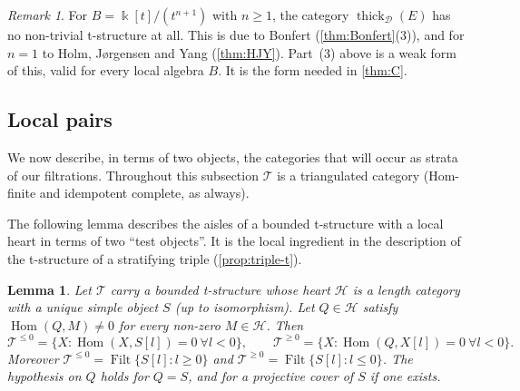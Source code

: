 \documentclass[11pt,reqno]{amsart}
\theoremstyle{plain}
\newtheorem{lemma}[theorem]{Lemma}
\theoremstyle{definition}
\theoremstyle{remark}
\newtheorem{remark}[theorem]{Remark}
\newcommand{\kk}{\Bbbk}
\DeclareMathOperator{\Hom}{Hom}
\DeclareMathOperator{\Filt}{Filt}
\newcommand{\thick}[2][\cD]{\operatorname{thick}_{#1}(#2)}
\newcommand{\cD}{\mathcal{D}}
\newcommand{\cH}{\mathcal{H}}
\newcommand{\cT}{\mathcal{T}}
\begin{document}
\begin{remark}\label{rem:local-exc-no-t}
For $B=\kk[t]/(t^{n+1})$ with $n\ge1$, the category $\thick E$ has no non-trivial t-structure at all. This is due to Bonfert \cite[Cor.~3.10]{Bonf26} (\cref{thm:Bonfert}(3)), and for $n=1$ to Holm, J\o rgensen and Yang (\cref{thm:HJY}). Part~(3) above is a weak form of this, valid for every local algebra $B$. It is the form needed in \cref{thm:C}.
\end{remark}


\subsection{Local pairs}
We now describe, in terms of two objects, the categories that will occur as strata of our filtrations. Throughout this subsection $\cT$ is a triangulated category (Hom-finite and idempotent complete, as always).

The following lemma describes the aisles of a bounded t-structure with a local heart in terms of two ``test objects''. It is the local ingredient in the description of the t-structure of a stratifying triple (\cref{prop:triple-t}).

\begin{lemma}\label{lem:aisles}
Let $\cT$ carry a bounded t-structure whose heart $\cH$ is a length category with a unique simple object $S$ (up to isomorphism). Let $Q\in\cH$ satisfy $\Hom(Q,M)\ne0$ for every non-zero $M\in\cH$. Then
\[\cT^{\le0}=\{X:\Hom(X,S[l])=0\ \forall l<0\},\qquad\cT^{\ge0}=\{X:\Hom(Q,X[l])=0\ \forall l<0\}.\]
Moreover $\cT^{\le0}=\Filt\{S[l]:l\ge0\}$ and $\cT^{\ge0}=\Filt\{S[l]:l\le0\}$. The hypothesis on $Q$ holds for $Q=S$, and for a projective cover of $S$ if one exists.
\end{lemma}
\end{document}
